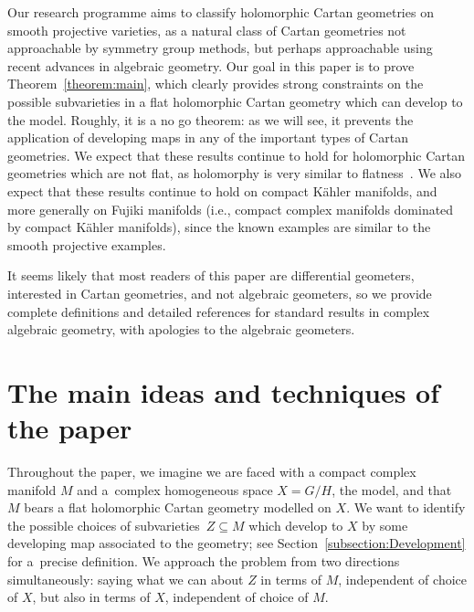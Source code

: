\documentclass[pdftex]{sigma}
\numberwithin{equation}{section}
\begin{document}
Our research programme aims to classify holomorphic Cartan geometries on smooth projective varieties, as a natural class of Cartan
geometries not approachable by symmetry group methods, but perhaps approachable using recent advances in algebraic geometry. Our goal in
this paper is to prove Theorem~\ref{theorem:main}, which clearly provides strong constraints on the possible subvarieties in a flat
holomorphic Cartan geometry which can develop to the model. Roughly, it is a no go theorem: as we will see, it prevents the application of
developing maps in any of the important types of Cartan geometries. We expect that these results continue to hold for holomorphic Cartan
geometries which are not flat, as holomorphy is very similar to flatness~\cite{Atiyah:1957}. We also expect that these results continue to
hold on compact K\"ahler manifolds, and more generally on Fujiki manifolds (i.e., compact complex manifolds dominated by compact K\"ahler
manifolds), since the known examples are similar to the smooth projective examples.

It seems likely that most readers of this paper are differential geometers, interested in Cartan geometries, and not algebraic geometers,
so we provide complete definitions and detailed references for standard results in complex algebraic geometry, with apologies to the
algebraic geometers.

\section{The main ideas and techniques of the paper}

Throughout the paper, we imagine we are faced with a compact complex manifold $M$ and a~complex homogeneous space $X = G/H$, the model,
and that $M$ bears a flat holomorphic Cartan geometry modelled on $X$. We want to identify the possible choices of subvarieties~$Z \subseteq M$ which develop to $X$ by some developing map associated to the geometry; see Section~\ref{subsection:Development}
for a~precise definition. We approach the problem from two directions simultaneously: saying what we can about $Z$ in terms of $M$,
independent of choice of $X$, but also in terms of $X$, independent of choice of $M$.
\end{document}
